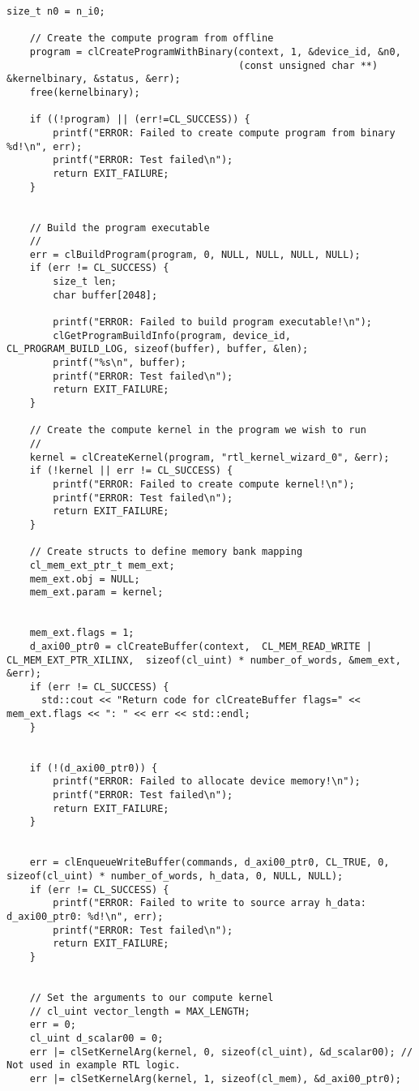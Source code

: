\begin{lstlisting}[label=code:hostexample3, caption=Содержимое файла host\_example.cpp, basicstyle=\tiny]
    size_t n0 = n_i0;

    // Create the compute program from offline
    program = clCreateProgramWithBinary(context, 1, &device_id, &n0,
                                        (const unsigned char **) &kernelbinary, &status, &err);
    free(kernelbinary);

    if ((!program) || (err!=CL_SUCCESS)) {
        printf("ERROR: Failed to create compute program from binary %d!\n", err);
        printf("ERROR: Test failed\n");
        return EXIT_FAILURE;
    }


    // Build the program executable
    //
    err = clBuildProgram(program, 0, NULL, NULL, NULL, NULL);
    if (err != CL_SUCCESS) {
        size_t len;
        char buffer[2048];

        printf("ERROR: Failed to build program executable!\n");
        clGetProgramBuildInfo(program, device_id, CL_PROGRAM_BUILD_LOG, sizeof(buffer), buffer, &len);
        printf("%s\n", buffer);
        printf("ERROR: Test failed\n");
        return EXIT_FAILURE;
    }

    // Create the compute kernel in the program we wish to run
    //
    kernel = clCreateKernel(program, "rtl_kernel_wizard_0", &err);
    if (!kernel || err != CL_SUCCESS) {
        printf("ERROR: Failed to create compute kernel!\n");
        printf("ERROR: Test failed\n");
        return EXIT_FAILURE;
    }

    // Create structs to define memory bank mapping
    cl_mem_ext_ptr_t mem_ext;
    mem_ext.obj = NULL;
    mem_ext.param = kernel;


    mem_ext.flags = 1;
    d_axi00_ptr0 = clCreateBuffer(context,  CL_MEM_READ_WRITE | CL_MEM_EXT_PTR_XILINX,  sizeof(cl_uint) * number_of_words, &mem_ext, &err);
    if (err != CL_SUCCESS) {
      std::cout << "Return code for clCreateBuffer flags=" << mem_ext.flags << ": " << err << std::endl;
    }


    if (!(d_axi00_ptr0)) {
        printf("ERROR: Failed to allocate device memory!\n");
        printf("ERROR: Test failed\n");
        return EXIT_FAILURE;
    }


    err = clEnqueueWriteBuffer(commands, d_axi00_ptr0, CL_TRUE, 0, sizeof(cl_uint) * number_of_words, h_data, 0, NULL, NULL);
    if (err != CL_SUCCESS) {
        printf("ERROR: Failed to write to source array h_data: d_axi00_ptr0: %d!\n", err);
        printf("ERROR: Test failed\n");
        return EXIT_FAILURE;
    }


    // Set the arguments to our compute kernel
    // cl_uint vector_length = MAX_LENGTH;
    err = 0;
    cl_uint d_scalar00 = 0;
    err |= clSetKernelArg(kernel, 0, sizeof(cl_uint), &d_scalar00); // Not used in example RTL logic.
    err |= clSetKernelArg(kernel, 1, sizeof(cl_mem), &d_axi00_ptr0); 


\end{lstlisting}
